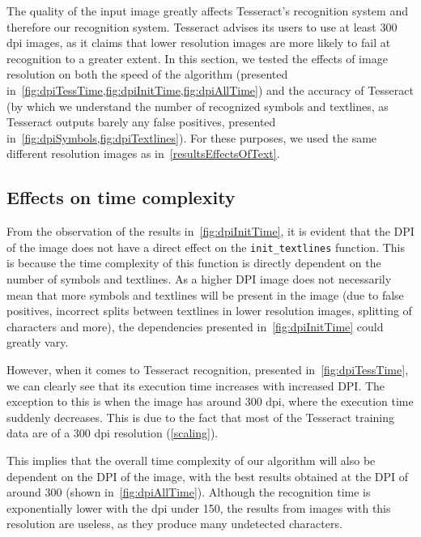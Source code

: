 The quality of the input image greatly affects Tesseract's recognition system and therefore our recognition system. Tesseract advises its users to use at least 300 dpi images, as it claims that lower resolution images are more likely to fail at recognition to a greater extent. In this section, we tested the effects of image resolution on both the speed of the algorithm (presented in~\cref{fig:dpiTessTime,fig:dpiInitTime,fig:dpiAllTime}) and the accuracy of Tesseract (by which we understand the number of recognized symbols and textlines, as Tesseract outputs barely any false positives, presented in~\cref{fig:dpiSymbols,fig:dpiTextlines}). For these purposes, we used the same different resolution images as in~\cref{resultsEffectsOfText}.

\subsection{Effects on time complexity}

From the observation of the results in~\cref{fig:dpiInitTime}, it is evident that the DPI of the image does not have a direct effect on the \texttt{init\_textlines} function. This is because the time complexity of this function is directly dependent on the number of symbols and textlines. As a higher DPI image does not necessarily mean that more symbols and textlines will be present in the image (due to false positives, incorrect splits between textlines in lower resolution images, splitting of characters and more), the dependencies presented in~\cref{fig:dpiInitTime} could greatly vary.

However, when it comes to Tesseract recognition, presented in~\cref{fig:dpiTessTime}, we can clearly see that its execution time increases with increased DPI. The exception to this is when the image has around 300 dpi, where the execution time suddenly decreases. This is due to the fact that most of the Tesseract training data are of a 300 dpi resolution (\cref{scaling}).

This implies that the overall time complexity of our algorithm will also be dependent on the DPI of the image, with the best results obtained at the DPI of around 300 (shown in~\cref{fig:dpiAllTime}). Although the recognition time is exponentially lower with the dpi under 150, the results from images with this resolution are useless, as they produce many undetected characters.

